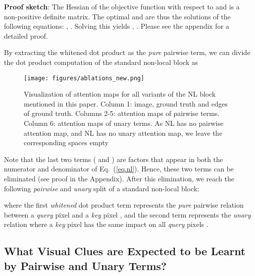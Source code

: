 \documentclass[runningheads]{llncs}
\begin{document}
\noindent \textbf{Proof sketch}: The Hessian of the objective function  with respect to  and  is a non-positive definite matrix. The optimal  and  are thus the solutions of the following equations: , . Solving this yields , . Please see the appendix for a detailed proof.

By extracting the whitened dot product as the \emph{pure} pairwise term, we can divide the dot product computation of the standard non-local block as
\begin{small}

\end{small}


\begin{figure*}[t]
\begin{center}
\texttt{[image: figures/ablations\_new.png]}
\end{center}
\vspace{-20pt}
\caption{Visualization of attention maps for all variants of the NL block mentioned in this paper. Column 1: image, ground truth and edges of ground truth. Columns 2-5: attention maps of pairwise terms. Column 6: attention maps of unary terms. As NL has no pairwise attention map, and NL has no unary attention map, we leave the corresponding spaces empty}
\label{fig:ablation}
\vspace{-10pt}
\end{figure*}

Note that the last two terms ( and ) are factors that appear in both the numerator and denominator of Eq.~(\ref{eq.nl}). Hence, these two terms can be eliminated (see proof in the Appendix). After this elimination, we reach the following \emph{pairwise} and \emph{unary} split of a standard non-local block:
\begin{small}

\end{small}
where the first \emph{whitened} dot product term represents the \emph{pure} pairwise relation between a \emph{query} pixel  and a \emph{key} pixel , and the second term represents the \emph{unary} relation where a \emph{key} pixel  has the same impact on all \emph{query} pixels .

\subsection{What Visual Clues are Expected to be Learnt by Pairwise and Unary Terms?}

\label{sec.visual_clues}
\end{document}

